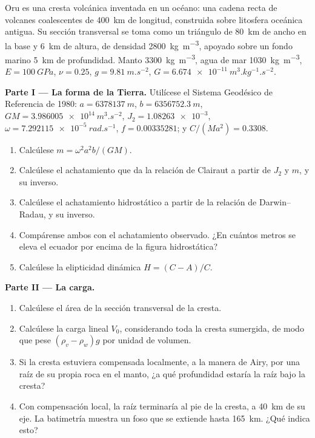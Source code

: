 \begin{problem}
\label{pb:b3:gravity-geodesy:1}
Oru es una cresta volcánica inventada en un océano: una cadena recta de volcanes coalescentes
de \qty{400}{km} de longitud, construida sobre litosfera oceánica antigua. Su
sección transversal se toma como un triángulo de \qty{80}{km} de ancho en la base y
\qty{6}{km} de altura, de densidad \qty{2800}{kg.m^{-3}}, apoyado sobre un fondo marino
\qty{5}{km} de profundidad. Manto \qty{3300}{kg.m^{-3}}, agua de mar
\qty{1030}{kg.m^{-3}}, $E = \qty{100}{GPa}$, $\nu = 0.25$, $g =
\qty{9.81}{m.s^{-2}}$, $G = \qty{6.674e-11}{m^3.kg^{-1}.s^{-2}}$.

\medskip
\noindent\textbf{Parte I --- La forma de la Tierra.} Utilícese el Sistema Geodésico
de Referencia de 1980: $a = \qty{6378137}{m}$, $b = \qty{6356752.3}{m}$,
$GM = \qty{3.986005e14}{m^3.s^{-2}}$, $J_2 = \num{1.08263e-3}$,
$\omega = \qty{7.292115e-5}{rad.s^{-1}}$, $f = \num{0.00335281}$; y
$C/(Ma^2) = \num{0.3308}$.
\begin{enumerate}
  \item Calcúlese $m = \omega^2a^2b/(GM)$.
  \item Calcúlese el achatamiento que da la relación de Clairaut a partir de $J_2$ y
        $m$, y su inverso.
  \item Calcúlese el achatamiento hidrostático a partir de la relación de Darwin--Radau, y
        su inverso.
  \item Compárense ambos con el achatamiento observado. ¿En cuántos metros se eleva el
        ecuador por encima de la figura hidrostática?
  \item Calcúlese la elipticidad dinámica $H = (C - A)/C$.
\end{enumerate}

\noindent\textbf{Parte II --- La carga.}
\begin{enumerate}[resume]
  \item Calcúlese el área de la sección transversal de la cresta.
  \item Calcúlese la carga lineal $V_0$, considerando toda la cresta sumergida, de modo
        que pese $(\rho_v - \rho_w)g$ por unidad de volumen.
  \item Si la cresta estuviera compensada localmente, a la manera de Airy, por una raíz de
        su propia roca en el manto, ¿a qué profundidad estaría la raíz bajo la
        cresta?
  \item Con compensación local, la raíz terminaría al pie de la cresta,
        a \qty{40}{km} de su eje. La batimetría muestra un foso que se extiende hasta
        \qty{165}{km}. ¿Qué indica esto?
\end{enumerate}


\end{problem}
